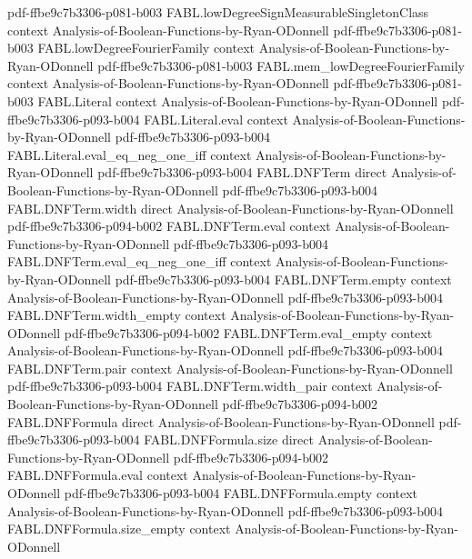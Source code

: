 \begin{theorem}
  {pdf-ffbe9c7b3306-p081-b003}
\proofstep
  {FABL.lowDegreeSignMeasurableSingletonClass}
  {context}
  {Analysis-of-Boolean-Functions-by-Ryan-ODonnell}
  {pdf-ffbe9c7b3306-p081-b003}
\proofstep
  {FABL.lowDegreeFourierFamily}
  {context}
  {Analysis-of-Boolean-Functions-by-Ryan-ODonnell}
  {pdf-ffbe9c7b3306-p081-b003}
\proofstep
  {FABL.mem_lowDegreeFourierFamily}
  {context}
  {Analysis-of-Boolean-Functions-by-Ryan-ODonnell}
  {pdf-ffbe9c7b3306-p081-b003}
\proofstep
  {FABL.Literal}
  {context}
  {Analysis-of-Boolean-Functions-by-Ryan-ODonnell}
  {pdf-ffbe9c7b3306-p093-b004}
\proofstep
  {FABL.Literal.eval}
  {context}
  {Analysis-of-Boolean-Functions-by-Ryan-ODonnell}
  {pdf-ffbe9c7b3306-p093-b004}
\proofstep
  {FABL.Literal.eval_eq_neg_one_iff}
  {context}
  {Analysis-of-Boolean-Functions-by-Ryan-ODonnell}
  {pdf-ffbe9c7b3306-p093-b004}
\proofstep
  {FABL.DNFTerm}
  {direct}
  {Analysis-of-Boolean-Functions-by-Ryan-ODonnell}
  {pdf-ffbe9c7b3306-p093-b004}
\proofstep
  {FABL.DNFTerm.width}
  {direct}
  {Analysis-of-Boolean-Functions-by-Ryan-ODonnell}
  {pdf-ffbe9c7b3306-p094-b002}
\proofstep
  {FABL.DNFTerm.eval}
  {context}
  {Analysis-of-Boolean-Functions-by-Ryan-ODonnell}
  {pdf-ffbe9c7b3306-p093-b004}
\proofstep
  {FABL.DNFTerm.eval_eq_neg_one_iff}
  {context}
  {Analysis-of-Boolean-Functions-by-Ryan-ODonnell}
  {pdf-ffbe9c7b3306-p093-b004}
\proofstep
  {FABL.DNFTerm.empty}
  {context}
  {Analysis-of-Boolean-Functions-by-Ryan-ODonnell}
  {pdf-ffbe9c7b3306-p093-b004}
\proofstep
  {FABL.DNFTerm.width_empty}
  {context}
  {Analysis-of-Boolean-Functions-by-Ryan-ODonnell}
  {pdf-ffbe9c7b3306-p094-b002}
\proofstep
  {FABL.DNFTerm.eval_empty}
  {context}
  {Analysis-of-Boolean-Functions-by-Ryan-ODonnell}
  {pdf-ffbe9c7b3306-p093-b004}
\proofstep
  {FABL.DNFTerm.pair}
  {context}
  {Analysis-of-Boolean-Functions-by-Ryan-ODonnell}
  {pdf-ffbe9c7b3306-p093-b004}
\proofstep
  {FABL.DNFTerm.width_pair}
  {context}
  {Analysis-of-Boolean-Functions-by-Ryan-ODonnell}
  {pdf-ffbe9c7b3306-p094-b002}
\proofstep
  {FABL.DNFFormula}
  {direct}
  {Analysis-of-Boolean-Functions-by-Ryan-ODonnell}
  {pdf-ffbe9c7b3306-p093-b004}
\proofstep
  {FABL.DNFFormula.size}
  {direct}
  {Analysis-of-Boolean-Functions-by-Ryan-ODonnell}
  {pdf-ffbe9c7b3306-p094-b002}
\proofstep
  {FABL.DNFFormula.eval}
  {context}
  {Analysis-of-Boolean-Functions-by-Ryan-ODonnell}
  {pdf-ffbe9c7b3306-p093-b004}
\proofstep
  {FABL.DNFFormula.empty}
  {context}
  {Analysis-of-Boolean-Functions-by-Ryan-ODonnell}
  {pdf-ffbe9c7b3306-p093-b004}
\proofstep
  {FABL.DNFFormula.size_empty}
  {context}
  {Analysis-of-Boolean-Functions-by-Ryan-ODonnell}

\end{theorem}
